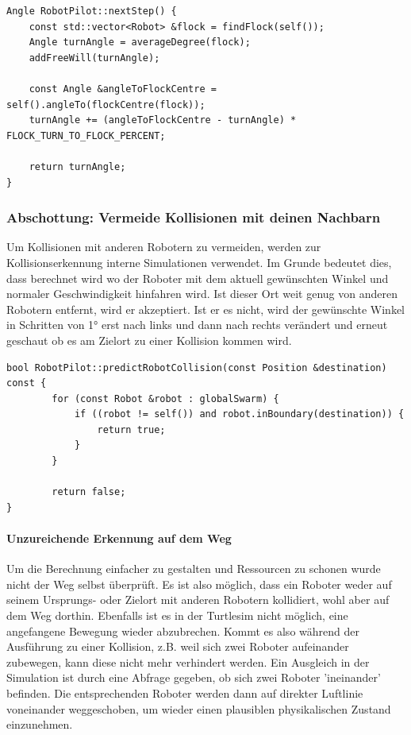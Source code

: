 \begin{lstlisting}[style=cpp, title=Berechnung des Fahrtwinkels]
Angle RobotPilot::nextStep() {
	const std::vector<Robot> &flock = findFlock(self());
	Angle turnAngle = averageDegree(flock);
	addFreeWill(turnAngle);

	const Angle &angleToFlockCentre = self().angleTo(flockCentre(flock));
	turnAngle += (angleToFlockCentre - turnAngle) * FLOCK_TURN_TO_FLOCK_PERCENT;

	return turnAngle;
}
\end{lstlisting}

\subsubsection*{Abschottung: Vermeide Kollisionen mit deinen Nachbarn}

Um Kollisionen mit anderen Robotern zu vermeiden, werden zur Kollisionserkennung interne Simulationen verwendet. Im Grunde bedeutet dies, dass berechnet wird wo der Roboter mit dem aktuell gewünschten Winkel und normaler Geschwindigkeit hinfahren wird. Ist dieser Ort weit genug von anderen Robotern entfernt, wird er akzeptiert. Ist er es nicht, wird der gewünschte Winkel in Schritten von 1° erst nach links und dann nach rechts verändert und erneut geschaut ob es am Zielort zu einer Kollision kommen wird.

\begin{lstlisting}[style=cpp, title=Simulation auf Kollisionen am Zielpunkt]
bool RobotPilot::predictRobotCollision(const Position &destination) const {
        for (const Robot &robot : globalSwarm) {
            if ((robot != self()) and robot.inBoundary(destination)) {
                return true;
            }
        }

        return false;
}
\end{lstlisting}

\paragraph*{Unzureichende Erkennung auf dem Weg}
Um die Berechnung einfacher zu gestalten und Ressourcen zu schonen wurde nicht der Weg selbst überprüft. Es ist also möglich, dass ein Roboter weder auf seinem Ursprungs- oder Zielort mit anderen Robotern kollidiert, wohl aber auf dem Weg dorthin. Ebenfalls ist es in der Turtlesim nicht möglich, eine angefangene Bewegung wieder abzubrechen. Kommt es also während der Ausführung zu einer Kollision, z.B. weil sich zwei Roboter aufeinander zubewegen, kann diese nicht mehr verhindert werden. Ein Ausgleich in der Simulation ist durch eine Abfrage gegeben, ob sich zwei Roboter 'ineinander' befinden. Die entsprechenden Roboter werden dann auf direkter Luftlinie voneinander weggeschoben, um wieder einen plausiblen physikalischen Zustand einzunehmen.

